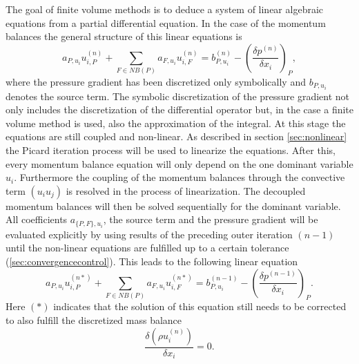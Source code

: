   The goal of finite volume methods is to deduce a system of linear algebraic equations from a partial differential equation. In the case of the momentum balances the general structure of this linear equations is
  \begin{equation}
    \label{eq:linfinal}
    a_{P,u_i} u_{i,P}^{(n)} + \sum_{F \in NB(P)} a_{F,u_i} u_{i,F}^{(n)} = b_{P,u_i}^{(n)} - \left(\frac{\delta p^{(n)}}{\delta x_i}\right)_P,
  \end{equation}
  where the pressure gradient has been discretized only symbolically and \(b_{P,u_i}\) denotes the source term. The symbolic discretization of the pressure gradient not only includes the discretization of the differential operator but, in the case a finite volume method is used, also the approximation of the integral. At this stage the equations are still coupled and non-linear. As described in section \ref{sec:nonlinear} the Picard iteration process will be used to linearize the equations. After this, every momentum balance equation will only depend on the one dominant variable \(u_i\). Furthermore the coupling of the momentum balances through the convective term \((u_i u_j)\) is resolved in the process of linearization. The decoupled momentum balances will then be solved sequentially for the dominant variable. All coefficients \(a_{\{P,F\},u_i}\), the source term and the pressure gradient will be evaluated explicitly by using results of the preceding outer iteration \((n-1)\) until the non-linear equations are fulfilled up to a certain tolerance (\ref{sec:convergencecontrol}). This leads to the following linear equation 
  \begin{equation}
    \label{eq:lininter}
    a_{P,u_i} u_{i,P}^{(n*)} + \sum_{F \in NB(P)} a_{F,u_i} u_{i,F}^{(n*)} = b_{P,u_i}^{(n-1)} - \left(\frac{\delta p^{(n-1)}}{\delta x_i}\right)_P.
\end{equation}
Here \((*)\) indicates that the solution of this equation still needs to be corrected to also fulfill the discretized mass balance
  \begin{equation}
    \label{eq:contisemi}
    \frac{\delta \left(\rho u_i^{(n)}\right)}{\delta x_i} = 0.
  \end{equation}

